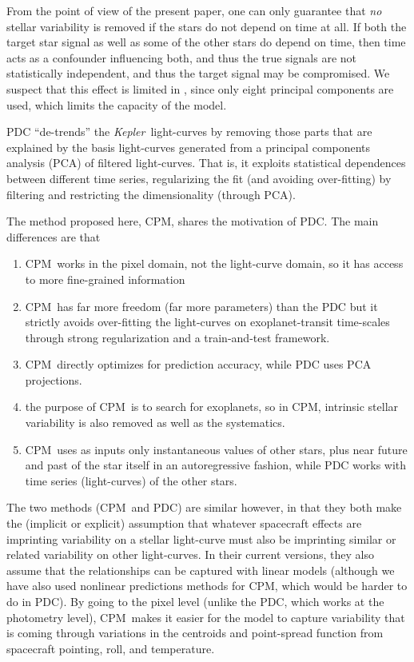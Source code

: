 \documentclass[12pt, preprint]{aastex}
\newcommand{\project}[1]{\textsl{#1}}
\newcommand{\Kepler}{\project{Kepler}}
\newcommand{\name}{CPM}
\begin{document}
From the point of view of the present paper, 
one can only guarantee that {\em no} stellar variability is removed if the stars do not depend on time at all. 
If both the target star signal as well as some of the other stars do depend on time, 
  then time acts as a confounder influencing both, and thus the true signals are not statistically independent, 
  and thus the target signal may be compromised. 
We suspect that this effect is limited in \cite{pdc2,pdc3}, 
  since only eight principal components are used, which limits the capacity of the model.

PDC ``de-trends'' the \Kepler\ light-curves by removing those parts that are explained by the basis light-curves
  generated from a principal components analysis (PCA) of filtered light-curves.
That is, it exploits statistical dependences between different time series, regularizing the fit (and avoiding over-fitting) 
  by filtering and restricting the dimensionality (through PCA).




The method proposed here, \name, shares the motivation of PDC.
The main differences are that
\begin{enumerate}
\item
\name\ works in the pixel domain, not the light-curve domain, so it has access to more fine-grained information
\item
\name\ has far more freedom (far more parameters) than the PDC
  but it strictly avoids over-fitting the light-curves on exoplanet-transit time-scales
  through strong regularization and a train-and-test framework.
\item 
\name\ directly optimizes for prediction accuracy, while PDC uses PCA projections.
\item
the purpose of \name\ is to search for exoplanets, so in \name, intrinsic stellar
  variability is also removed as well as the systematics.
\item 
\name\ uses as inputs only instantaneous values of other stars, plus near future and past of the star itself in an autoregressive fashion, while PDC works with time series (light-curves) of the other stars.
\end{enumerate}



The two methods (\name\ and PDC) are similar however,
  in that they both make the (implicit or explicit) assumption that whatever spacecraft effects are imprinting variability on a stellar light-curve
  must also be imprinting similar or related variability on other light-curves.
In their current versions, they also assume that the relationships can be captured with linear models (although we have also used nonlinear predictions methods for \name, which would be harder to do in PDC).
By going to the pixel level (unlike the PDC, which works at the photometry level),
  \name\ makes it easier for the model to capture variability
  that is coming through variations in the centroids and point-spread function
  from spacecraft pointing, roll, and temperature.
\end{document}
